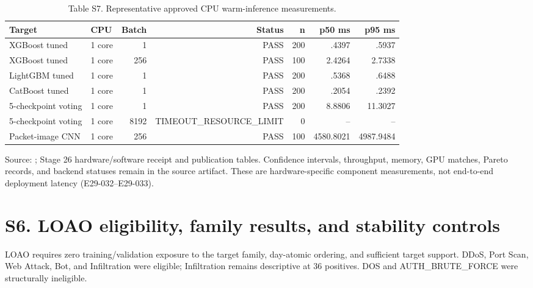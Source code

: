 \documentclass[preprint,12pt]{elsarticle}
\begin{document}
\begin{table}[htbp]
\centering\tiny
\caption{Table S7. Representative approved CPU warm-inference measurements.}
\begin{tabular}{@{}llrrrrr@{}}
\toprule
Target & CPU & Batch & Status & n & p50 ms & p95 ms\\
\midrule
XGBoost tuned & 1 core & 1 & PASS & 200 & .4397 & .5937\\
XGBoost tuned & 1 core & 256 & PASS & 100 & 2.4264 & 2.7338\\
LightGBM tuned & 1 core & 1 & PASS & 200 & .5368 & .6488\\
CatBoost tuned & 1 core & 1 & PASS & 200 & .2054 & .2392\\
5-checkpoint voting & 1 core & 1 & PASS & 200 & 8.8806 & 11.3027\\
5-checkpoint voting & 1 core & 8192 & TIMEOUT\_RESOURCE\_LIMIT & 0 & -- & --\\
Packet-image CNN & 1 core & 256 & PASS & 100 & 4580.8021 & 4987.9484\\
\bottomrule
\end{tabular}
\end{table}
Source: ; Stage 26 hardware/software receipt and publication tables. Confidence intervals, throughput, memory, GPU matches, Pareto records, and backend statuses remain in the source artifact. These are hardware-specific component measurements, not end-to-end deployment latency (E29-032--E29-033).

\section*{S6. LOAO eligibility, family results, and stability controls}
LOAO requires zero training/validation exposure to the target family, day-atomic ordering, and sufficient target support. DDoS, Port Scan, Web Attack, Bot, and Infiltration were eligible; Infiltration remains descriptive at 36 positives. DOS and AUTH\_BRUTE\_FORCE were structurally ineligible.
\end{document}
